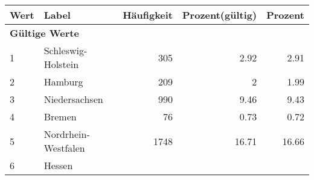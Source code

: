      \begin{longtable}{lXrrr}
     \toprule
     \textbf{Wert} & \textbf{Label} & \textbf{Häufigkeit} & \textbf{Prozent(gültig)} & \textbf{Prozent} \\
     \endhead
     \midrule
     \multicolumn{5}{l}{\textbf{Gültige Werte}}\\

     1 &
     \multicolumn{1}{X}{ Schleswig-Holstein   } &


       \num{305} &
       \num[round-mode=places,round-precision=2]{2,92} &
         \num[round-mode=places,round-precision=2]{2,91} \\

     2 &
     \multicolumn{1}{X}{ Hamburg   } &


       \num{209} &
       \num[round-mode=places,round-precision=2]{2} &
         \num[round-mode=places,round-precision=2]{1,99} \\

     3 &
     \multicolumn{1}{X}{ Niedersachsen   } &


       \num{990} &
       \num[round-mode=places,round-precision=2]{9,46} &
         \num[round-mode=places,round-precision=2]{9,43} \\

     4 &
     \multicolumn{1}{X}{ Bremen   } &


       \num{76} &
       \num[round-mode=places,round-precision=2]{0,73} &
         \num[round-mode=places,round-precision=2]{0,72} \\

     5 &
     \multicolumn{1}{X}{ Nordrhein-Westfalen   } &


       \num{1748} &
       \num[round-mode=places,round-precision=2]{16,71} &
         \num[round-mode=places,round-precision=2]{16,66} \\

     6 &
     \multicolumn{1}{X}{ Hessen   } &



\end{longtable}
